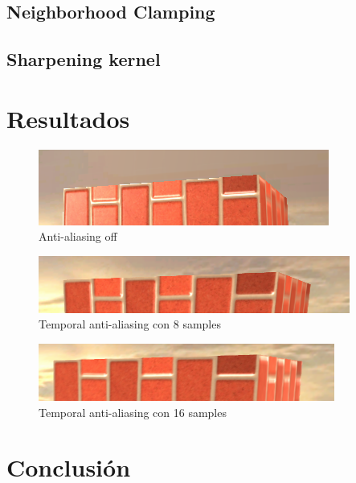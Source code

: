 \documentclass[withindex, glossary]{cam-thesis}
\begin{document}
\section{Neighborhood Clamping}

\section{Sharpening kernel}

\chapter{Resultados}

\begin{figure}[!htb]
    \includegraphics[width=\linewidth]{figures/taaoff.png}
    \caption{Anti-aliasing off}
\end{figure}

\begin{figure}[!htb]
    \includegraphics[width=\linewidth]{figures/taa8.png}
    \caption{Temporal anti-aliasing con 8 samples}
\end{figure}

\begin{figure}[!htb]
    \includegraphics[width=\linewidth]{figures/taa16.png}
    \caption{Temporal anti-aliasing con 16 samples}
\end{figure}

\chapter{Conclusión}

\nocite{*}
\printbibliography{}

\listoffigures
\listoftables

\printthesisindex{}
\end{document}
